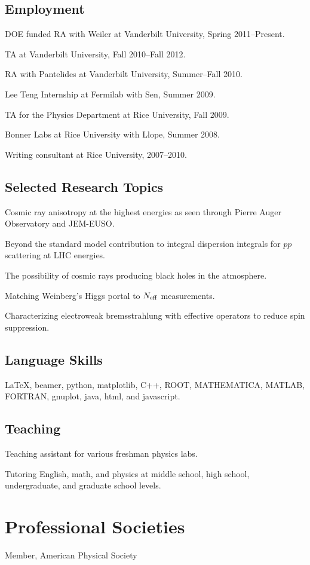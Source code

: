 \documentclass[letterpaper]{article}
\renewenvironment{itemize}{
\begin{list}{}{
\setlength{\leftmargin}{1.5em}
}
}{
\end{list}
}
\begin{document}
\subsection*{Employment}
\begin{itemize}
\item DOE funded RA with Weiler at Vanderbilt University, Spring 2011--Present.
\item TA at Vanderbilt University, Fall 2010--Fall 2012.
\item RA with Pantelides at Vanderbilt University, Summer--Fall 2010.
\item Lee Teng Internship at Fermilab with Sen, Summer 2009.
\item TA for the Physics Department at Rice University, Fall 2009.
\item Bonner Labs at Rice University with Llope, Summer 2008.
\item Writing consultant at Rice University, 2007--2010.
\end{itemize}
\subsection*{Selected Research Topics}
\begin{itemize}
\item Cosmic ray anisotropy at the highest energies as seen through Pierre Auger Observatory and JEM-EUSO.
\item Beyond the standard model contribution to integral dispersion integrals for $pp$ scattering at LHC energies.
\item The possibility of cosmic rays producing black holes in the atmosphere.
\item Matching Weinberg's Higgs portal to $N_{\rm{eff}}$ measurements.
\item Characterizing electroweak bremsstrahlung with effective operators to reduce spin suppression.
\end{itemize}
\subsection*{Language Skills}
\begin{itemize}
\item 
\LaTeX, beamer, python, matplotlib, C++, ROOT, MATHEMATICA, MATLAB, FORTRAN, gnuplot, java, html, and javascript.
\end{itemize}
\subsection*{Teaching}
\begin{itemize}
\item Teaching assistant for various freshman physics labs.
\item Tutoring English, math, and physics at middle school, high school, undergraduate, and graduate school levels.
\end{itemize}
\section*{Professional Societies}
\begin{itemize}
\item Member, American Physical Society
\end{itemize}
\end{document}
